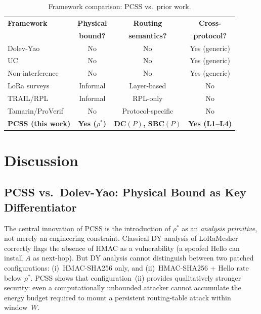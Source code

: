 \documentclass[journal,compsoc]{IEEEtran}
\theoremstyle{plain}
\theoremstyle{definition}
\theoremstyle{remark}
\newcommand{\rhostar}{\rho^*}
\newcommand{\hmac}{\textsf{HMAC-SHA256}}
\begin{document}
\begin{table}[t]
  \caption{Framework comparison: PCSS vs.\ prior work.}
  \label{tab:framework-comparison}
  \centering
  \setlength{\tabcolsep}{4pt}
  \begin{tabular}{lccc}
    \toprule
    \textbf{Framework} & \textbf{Physical} & \textbf{Routing} & \textbf{Cross-} \\
                       & \textbf{bound?}   & \textbf{semantics?} & \textbf{protocol?} \\
    \midrule
    Dolev-Yao~\cite{dolev1983security}            & No  & No  & Yes (generic) \\
    UC~\cite{canetti2001universally}               & No  & No  & Yes (generic) \\
    Non-interference~\cite{goguen1982security}     & No  & No  & Yes (generic) \\
    LoRa surveys~\cite{butun2019security,aras2017exploring} & Informal & Layer-based & No \\
    TRAIL/RPL~\cite{perazzo2017trail}              & Informal & RPL-only & No \\
    Tamarin/ProVerif~\cite{meier2013tamarin}       & No  & Protocol-specific & No \\
    \textbf{PCSS (this work)}                      & \textbf{Yes ($\rho^*$)} & \textbf{DC$(P)$, SBC$(P)$} & \textbf{Yes (L1--L4)} \\
    \bottomrule
  \end{tabular}
\end{table}

\section{Discussion}
\label{sec:discussion}

\subsection{PCSS vs.\ Dolev-Yao: Physical Bound as Key Differentiator}

The central innovation of PCSS is the introduction of $\rhostar$ as an
\emph{analysis primitive}, not merely an engineering constraint.  Classical
DY analysis of LoRaMesher correctly flags the absence of HMAC as a
vulnerability (a spoofed Hello can install $A$ as next-hop).  But DY
analysis cannot distinguish between two patched configurations:
(i)~\hmac{} only, and (ii)~\hmac{} + Hello rate below $\rhostar$.
PCSS shows that configuration~(ii) provides qualitatively stronger security:
even a computationally unbounded attacker cannot accumulate the energy
budget required to mount a persistent routing-table attack within window~$W$.
\end{document}
